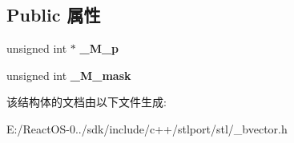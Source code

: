 \subsection*{Public 属性}
\begin{DoxyCompactItemize}
\item 
\mbox{\label{struct___bit__reference_a65e67c5584bcb949d8e00ace4646cfea}} 
unsigned int $\ast$ {\bfseries \+\_\+\+M\+\_\+p}
\item 
\mbox{\label{struct___bit__reference_ab5078ecb5fa8a5a22d097c71f0470b53}} 
unsigned int {\bfseries \+\_\+\+M\+\_\+mask}
\end{DoxyCompactItemize}


该结构体的文档由以下文件生成\+:\begin{DoxyCompactItemize}
\item 
E\+:/\+React\+O\+S-\/0../sdk/include/c++/stlport/stl/\+\_\+bvector.\+h\end{DoxyCompactItemize}
